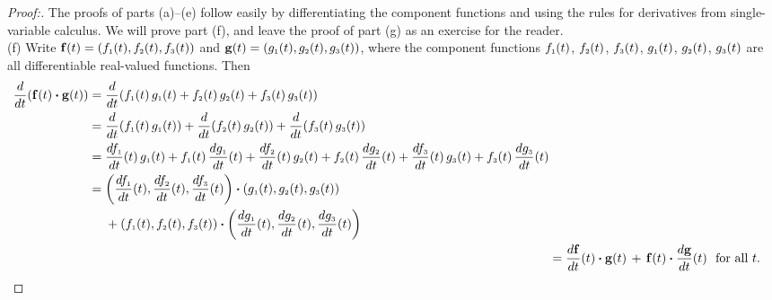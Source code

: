 \begin{proofbar}\begin{proof}[Proof:]
 The proofs of parts (a)--(e) follow easily by differentiating the component functions and using the rules for derivatives from single-variable calculus. 
 We will prove part (f), and leave the proof of part (g) as an exercise for
 the reader.
 \smallskip\\(f)
 Write $\mathbf{f}(t) = ( f_{\scriptscriptstyle 1}(t),f_{\scriptscriptstyle 2}(t),f_{\scriptscriptstyle 3}(t) )$ and
 $\mathbf{g}(t) = ( g_{\scriptscriptstyle 1}(t),g_{\scriptscriptstyle 2}(t),g_{\scriptscriptstyle 3}(t) )$, where the component functions
 $f_{\scriptscriptstyle 1}(t)$, $f_{\scriptscriptstyle 2}(t)$, $f_{\scriptscriptstyle 3}(t)$, $g_{\scriptscriptstyle 1}(t)$, $g_{\scriptscriptstyle 2}(t)$, $g_{\scriptscriptstyle 3}(t)$ are all
 differentiable real-valued functions. Then
 \begin{align*}\begin{split}
  \dfrac{d}{dt} ( \mathbf{f}(t) \bm{\cdot} \mathbf{g}(t) ) &= \dfrac{d}{dt} ( f_{\scriptscriptstyle 1}(t)\,g_{\scriptscriptstyle 1}(t) +
   f_{\scriptscriptstyle 2}(t)\,g_{\scriptscriptstyle 2}(t) + f_{\scriptscriptstyle 3}(t)\,g_{\scriptscriptstyle 3}(t) )\\
  &= \dfrac{d}{dt} ( f_{\scriptscriptstyle 1}(t)\,g_{\scriptscriptstyle 1}(t) ) +
   \dfrac{d}{dt} ( f_{\scriptscriptstyle 2}(t)\,g_{\scriptscriptstyle 2}(t) ) + \dfrac{d}{dt} ( f_{\scriptscriptstyle 3}(t)\,g_{\scriptscriptstyle 3}(t) )\\
  &= \dfrac{df_{\scriptscriptstyle 1}}{dt}(t)\,g_{\scriptscriptstyle 1}(t) + f_{\scriptscriptstyle 1}(t)\,\dfrac{dg_{\scriptscriptstyle 1}}{dt}(t) +
   \dfrac{df_{\scriptscriptstyle 2}}{dt}(t)\,g_{\scriptscriptstyle 2}(t) + f_{\scriptscriptstyle 2}(t)\,\dfrac{dg_{\scriptscriptstyle 2}}{dt}(t) +
   \dfrac{df_{\scriptscriptstyle 3}}{dt}(t)\,g_{\scriptscriptstyle 3}(t) + f_{\scriptscriptstyle 3}(t)\,\dfrac{dg_{\scriptscriptstyle 3}}{dt}(t)\\
  &= \biggl( \dfrac{df_{\scriptscriptstyle 1}}{dt}(t),\dfrac{df_{\scriptscriptstyle 2}}{dt}(t),\dfrac{df_{\scriptscriptstyle 3}}{dt}(t) \biggr) \bm{\cdot} 
   ( g_{\scriptscriptstyle 1}(t),g_{\scriptscriptstyle 2}(t),g_{\scriptscriptstyle 3}(t) )\\
   &\mathrel{\phantom{=}} {} + ( f_{\scriptscriptstyle 1}(t),f_{\scriptscriptstyle 2}(t),f_{\scriptscriptstyle 3}(t) ) \bm{\cdot} 
   \biggl( \dfrac{dg_{\scriptscriptstyle 1}}{dt}(t),\dfrac{dg_{\scriptscriptstyle 2}}{dt}(t),\dfrac{dg_{\scriptscriptstyle 3}}{dt}(t) \biggr)\end{split}\\
  &= \dfrac{d\mathbf{f}}{dt}(t) \bm{\cdot} \mathbf{g}(t) \,+\, \mathbf{f}(t) \bm{\cdot} \dfrac{d\mathbf{g}}{dt}(t)
   \text{~~for all $t$.} \qedhere
 \end{align*}
\end{proof}\end{proofbar}

